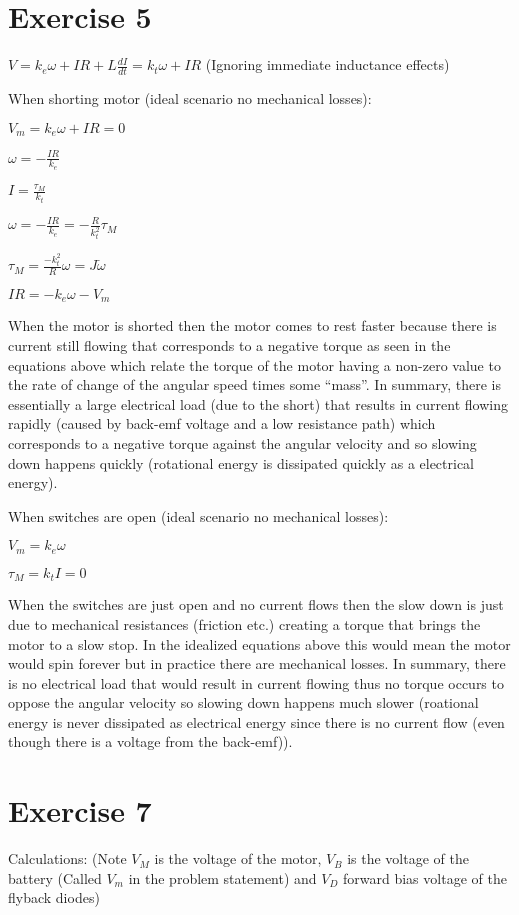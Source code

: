\documentclass[12pt]{article}
\begin{document}
\section*{Exercise 5}
$V = k_e \omega + IR + L\frac{dI}{dt} = k_t \omega + IR$ (Ignoring immediate inductance effects)

When shorting motor (ideal scenario no mechanical losses):

$V_m = k_e \omega + IR = 0 $  %

$\omega = -\frac{IR}{k_e}$

$I = \frac{\tau_M}{k_t}$

$\omega = -\frac{IR}{k_e} = -\frac{R}{k_t^2}\tau_M$

$\tau_M = \frac{-k_t^2}{R}\omega = J \dot\omega$

$IR = -k_e \omega - V_m$

When the motor is shorted then the motor comes to rest faster because there is current still flowing that corresponds to a negative torque as seen in the equations above which relate the torque of the motor having a non-zero value to the rate of change of the angular speed times some ``mass''. 
In summary, there is essentially a large electrical load (due to the short) that results in current flowing rapidly (caused by back-emf voltage and a low resistance path) which corresponds to a negative torque against the angular velocity and so slowing down happens quickly (rotational energy is dissipated quickly as a electrical energy).

When switches are open (ideal scenario no mechanical losses):

$V_m = k_e \omega $ 

$\tau_M = k_t I = 0$

When the switches are just open and no current flows then the slow down is just due to mechanical resistances (friction etc.) creating a torque that brings the motor to a slow stop.
In the idealized equations above this would mean the motor would spin forever but in practice there are mechanical losses.
In summary, there is no electrical load that would result in current flowing thus no torque occurs to oppose the angular velocity so slowing down happens much slower (roational energy is never dissipated as electrical energy since there is no current flow (even though there is a voltage from the back-emf)).

\section*{Exercise 7}
Calculations: 
(Note $V_M$ is the voltage of the motor, $V_B$ is the voltage of the battery (Called $V_m$ in the problem statement) and $V_D$ forward bias voltage of the flyback diodes)
\end{document}

